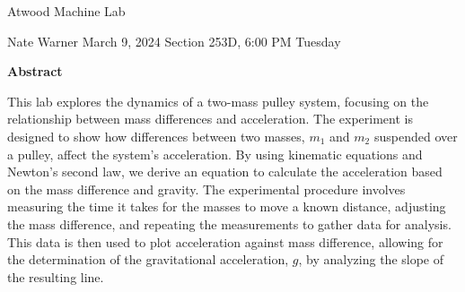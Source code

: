 \documentclass{report}
\title{\Huge{}}
\author{\huge{Nathan Warner}}
\date{\huge{}}
\begin{document}
    \begin{center}
        \begin{Huge}
            Atwood Machine Lab
        \end{Huge}
        \begin{Large}
            \bigbreak \noindent 
            Nate Warner
            \smallbreak \noindent
            March 9, 2024
            \bigbreak \noindent 
            Section 253D, 6:00 PM Tuesday 
        \end{Large}
    \end{center}
    \pagebreak 
    \tableofcontents
    \pagebreak \bigbreak \noindent 
    \begin{center}
    \textbf{Abstract}
    \end{center}
    \begin{adjustwidth}{.3in}{.3in}
        \hspace{\parindent}  This lab explores the dynamics of a two-mass pulley system, focusing on the relationship between mass differences and acceleration. The experiment is designed to show how differences between two masses, $m_{1}$ and $m_{2}$ suspended over a pulley, affect the system's acceleration. By using kinematic equations and Newton's second law, we derive an equation to calculate the acceleration based on the mass difference and gravity. The experimental procedure involves measuring the time it takes for the masses to move a known distance, adjusting the mass difference, and repeating the measurements to gather data for analysis. This data is then used to plot acceleration against mass difference, allowing for the determination of the gravitational acceleration, $g$, by analyzing the slope of the resulting line. 
    \end{adjustwidth}
\end{document}
